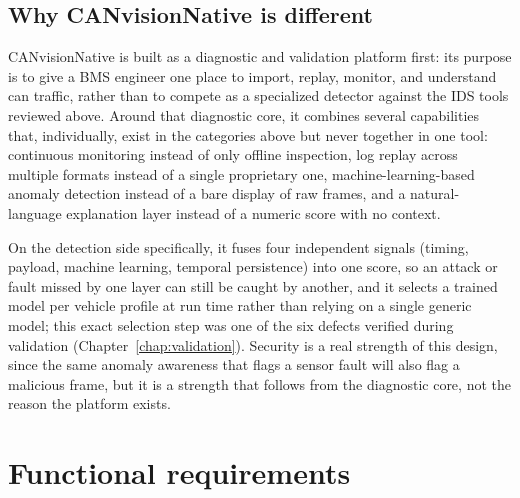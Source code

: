 \subsection{Why CANvisionNative is different}

CANvisionNative is built as a diagnostic and validation platform first: its purpose is to give a BMS engineer one place to import, replay, monitor, and understand \gls{can} traffic, rather than to compete as a specialized detector against the IDS tools reviewed above. Around that diagnostic core, it combines several capabilities that, individually, exist in the categories above but never together in one tool: continuous monitoring instead of only offline inspection, log replay across multiple formats instead of a single proprietary one, machine-learning-based anomaly detection instead of a bare display of raw frames, and a natural-language explanation layer instead of a numeric score with no context.

On the detection side specifically, it fuses four independent signals (timing, payload, machine learning, temporal persistence) into one score, so an attack or fault missed by one layer can still be caught by another, and it selects a trained model per vehicle profile at run time rather than relying on a single generic model; this exact selection step was one of the six defects verified during validation (Chapter~\ref{chap:validation}). Security is a real strength of this design, since the same anomaly awareness that flags a sensor fault will also flag a malicious frame, but it is a strength that follows from the diagnostic core, not the reason the platform exists.

\section{Functional requirements}

